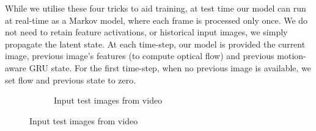 While we utilise these four tricks to aid training, at test time our model can run at real-time as a Markov model, where each frame is processed only once. We do not need to retain feature activations, or historical input images, we simply propagate the latent state. At each time-step, our model is provided the current image, previous image's features (to compute optical flow) and previous motion-aware GRU state. For the first time-step, when no previous image is available, we set flow and previous state to zero.

\begin{figure}[t]
\begin{subfigure}[t]{\linewidth}
\begin{center}
  \caption{Input test images from video}
\end{center}
\end{subfigure}


\end{figure}
